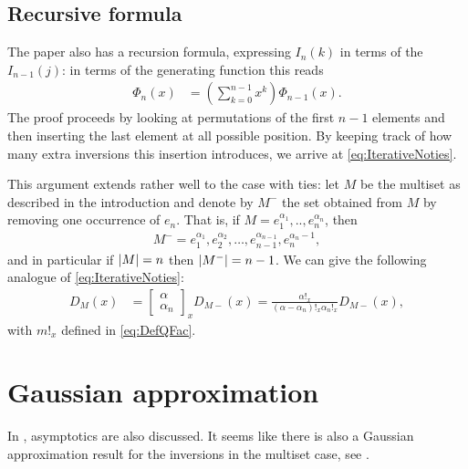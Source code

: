 \documentclass{article}
\DeclarePairedDelimiter\abs{\lvert}{\rvert}
\begin{document}
\subsection{Recursive formula}

The paper \cite{Margolius2001} also has a recursion formula, expressing $I_n(k)$ in terms of the $I_{n-1}(j)$: in terms of the generating function this reads
\begin{align}
\label{eq:IterativeNoties}
    \Phi_n(x) &= \left(\sum_{k=0}^{n-1} x^k\right) \Phi_{n-1}(x).  
\end{align}
The proof proceeds by looking at permutations of the first $n-1$ elements and then inserting the last element at all possible position. By keeping track of how many extra inversions this insertion introduces, we arrive at \eqref{eq:IterativeNoties}.

This argument extends rather well to the case with ties: let $M$ be the multiset as described in the introduction and denote by $M^-$ the set obtained from $M$ by removing one occurrence of $e_n$. That is, if $M=e_1^{\alpha_1},..,e_n^{\alpha_n}$, then
\begin{align}
    M^- = e_1^{\alpha_1}, e_2^{\alpha_2},\ldots,e_{n-1}^{\alpha_{n-1}}, e_n^{\alpha_n-1},
\end{align}
and in particular if $\abs{M}=n$ then $\abs{M^-}=n-1$. We can give the following analogue of \eqref{eq:IterativeNoties}:
\begin{align}
    D_M(x) & = \begin{bmatrix}\alpha\\ \alpha_n\end{bmatrix}_x D_{M-}(x) = \frac{\alpha!_x}{(\alpha-\alpha_n)!_x \alpha_n!_x} D_{M-}(x),
\end{align}
with $m!_x$ defined in \eqref{eq:DefQFac}.



\section{Gaussian approximation}

In \cite{Margolius2001}, asymptotics are also discussed. It seems like there is also a Gaussian approximation result for the inversions in the multiset case, see \cite{Conger2007}. 





\end{document}
